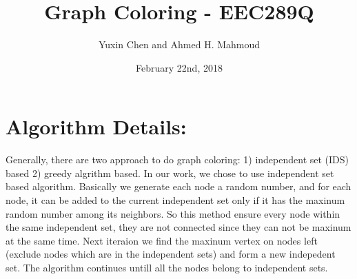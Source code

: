 \documentclass[12pt] {article}
\begin{document}
\title{Graph Coloring -  EEC289Q}
\author{Yuxin Chen and Ahmed H. Mahmoud}
\date{February 22nd, 2018}
\maketitle

\section{Algorithm Details:}
Generally, there are two approach to do graph coloring: 1) independent set (IDS) based 2) greedy algrithm based. In our work, we chose to use independent set based algorithm. Basically we generate each node a random number, and for each node, it can be added to the current independent set only if it has the maxinum random number among its neighbors. So this method ensure every node within the same independent set, they are not connected since they can not be maxinum at the same time. Next iteraion we find the maxinum vertex on nodes left (exclude nodes which are in the independent sets) and form a new indepedent set. The algorithm continues untill all the nodes belong to independent sets.
\end{document}
